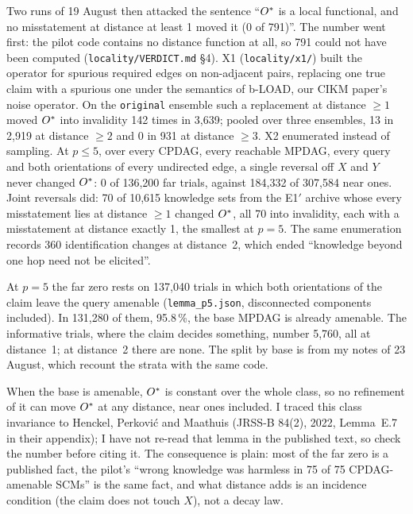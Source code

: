 Two runs of 19 August then attacked the sentence ``$O^{*}$ is a local functional, and no
misstatement at distance at least 1 moved it (0 of 791)''. The number went first: the pilot code
contains no distance function at all, so 791 could not have been computed
(\texttt{locality/VERDICT.md} \S4). X1 (\texttt{locality/x1/}) built the operator for spurious
required edges on non-adjacent pairs, replacing one true claim with a spurious one under the semantics of
b-LOAD, our CIKM paper's noise operator. On the \texttt{original} ensemble such a replacement at distance $\ge 1$ moved
$O^{*}$ into invalidity 142 times in 3,639; pooled over three ensembles, 13 in 2,919 at distance
$\ge 2$ and 0 in 931 at distance $\ge 3$. X2 enumerated instead of sampling. At
$p \le 5$, over every CPDAG, every reachable MPDAG, every query and both orientations of every
undirected edge, a single reversal off $X$ and $Y$ never changed $O^{*}$: 0 of 136,200 far trials,
against 184,332 of 307,584 near ones. Joint reversals did: 70 of 10,615 knowledge sets from the
E1$'$ archive whose every misstatement lies at distance $\ge 1$ changed $O^{*}$, all 70 into
invalidity, each with a misstatement at distance exactly 1, the smallest at $p = 5$. The same
enumeration records 360 identification changes at distance~2, which ended ``knowledge beyond one hop
need not be elicited''.

\begin{medido}
At $p = 5$ the far zero rests on 137,040 trials in which both orientations of the claim leave the
query amenable (\texttt{lemma\_p5.json}, disconnected components included). In 131,280 of them, 95.8\,\%, the base MPDAG is
already amenable. The informative trials, where the claim decides something, number 5,760, all at
distance~1; at distance~2 there are none. The split by base is from my notes of 23 August, which
recount the strata with the same code.
\end{medido}

When the base is amenable, $O^{*}$ is constant over the whole class, so no refinement of it can
move $O^{*}$ at any distance, near ones included. I traced this class invariance to Henckel,
Perkovi\'c and Maathuis (JRSS-B 84(2), 2022, Lemma~E.7 in their appendix); I have not re-read that
lemma in the published text, so check the number before citing it. The consequence is plain: most
of the far zero is a published fact, the pilot's ``wrong knowledge was harmless in 75 of 75
CPDAG-amenable SCMs'' is the same fact, and what distance adds is an incidence condition (the claim
does not touch $X$), not a decay law.

